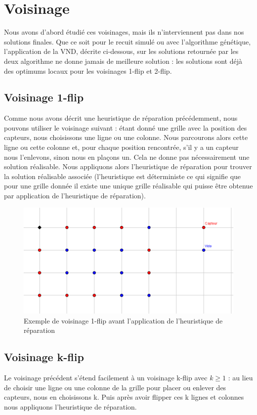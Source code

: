 \documentclass[12pt,a4paper]{article}
\begin{document}
\section{Voisinage}
Nous avons d'abord étudié ces voisinages, mais ils n'interviennent pas dans nos solutions finales. Que ce soit pour le recuit simulé ou avec l'algorithme génétique, l'application de la VND, décrite ci-dessous, sur les solutions retournée par les deux algorithme ne donne jamais de meilleure solution : les solutions sont déjà des optimums locaux pour les voisinages 1-flip et 2-flip. 
\subsection{Voisinage 1-flip}
Comme nous avons décrit une heuristique de réparation précédemment, nous pouvons utiliser le voisinage suivant : étant donné une grille avec la position des capteurs, nous choisissons une ligne ou une colonne. Nous parcourons alors cette ligne ou cette colonne et, pour chaque position rencontrée, s'il y a un capteur nous l'enlevons, sinon nous en plaçons un. Cela ne donne pas nécessairement une solution réalisable. Nous appliquons alors l'heuristique de réparation pour trouver la solution réalisable associée (l'heuristique est déterministe ce qui signifie que pour une grille donnée il existe une unique grille réalisable qui puisse être obtenue par application de l'heuristique de réparation).
\begin{figure}[h]
\center
\includegraphics[scale=1]{Images/1_flip.png}
\caption{Exemple de voisinage 1-flip avant l'application de l'heuristique de réparation}
\end{figure}

\subsection{Voisinage k-flip}
Le voisinage précédent s'étend facilement à un voisinage k-flip avec $k \geq 1$ : au lieu de choisir une ligne ou une colonne de la grille pour placer ou enlever des capteurs, nous en choisissons k. Puis après avoir flipper ces k lignes et colonnes nous appliquons l'heuristique de réparation.
\end{document}
